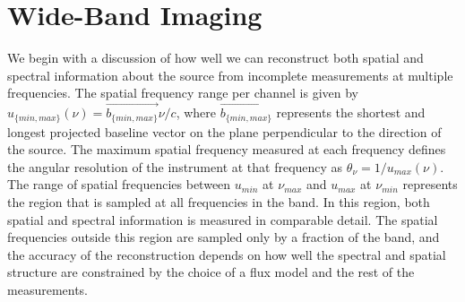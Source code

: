 \documentclass[structabstract]{aa}
\begin{document}


\section{Wide-Band Imaging}\label{IMAGING}


We begin with a discussion of how well we can reconstruct both spatial and 
spectral information about the source
from incomplete measurements at multiple frequencies. 
The spatial frequency range per channel is given by 
$u_{\{min,max\}}(\nu) = \vec{b_{\{min,max\}}} \nu/c$, where
$\vec{b_{\{min,max\}}}$ represents the shortest and longest projected baseline vector on
the plane perpendicular to the direction of the source. 
The maximum spatial frequency measured at each frequency defines the angular resolution of
the instrument at that frequency as $\theta_{\nu} = 1/u_{max}(\nu)$.
The range of spatial frequencies between $u_{min}$ at $\nu_{max}$ and  $u_{max}$ at $\nu_{min}$
represents the region that is sampled at all frequencies in the band. In this region, 
both spatial and spectral information is measured in comparable detail. 
The spatial frequencies outside this region are sampled only by a fraction of the band, and 
the accuracy of the reconstruction depends on how well the spectral and spatial structure are
constrained by the choice of a flux model and the rest of the measurements.
\end{document}
